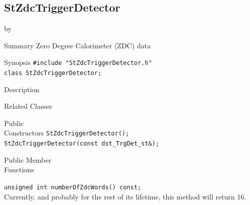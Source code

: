 \documentclass[twoside]{article}
\newcommand{\entrylabel}[1]{\mbox{\textbf{{#1}}}\hfil}%
\newenvironment{entry}
{\begin{list}{}%
    {\renewcommand{\makelabel}{\entrylabel}%
     \setlength{\labelwidth}{90pt}%
     \setlength{\leftmargin}{\labelwidth}
     \advance\leftmargin by \labelsep%
      }%
    }%
  {\end{list}}
\newcommand{\Entrylabel}[1]%
{\raisebox{0pt}[1ex][0pt]{\makebox[\labelwidth][l]%
    {\parbox[t]{\labelwidth}{\hspace{0pt}\textbf{{#1}}}}}}
\newenvironment{Entry}%
{\renewcommand{\entrylabel}{\Entrylabel}\begin{entry}}%
  {\end{entry}}
\begin{document}
\subsection{StZdcTriggerDetector}
\label{sec:StZdcTriggerDetector}
\begin{Entry}
\item[Summary] Zero Degree Calorimeter (ZDC) data
\item[Synopsis]
    \verb+#include "StZdcTriggerDetector.h"+\\
    \verb+class StZdcTriggerDetector;+\\
\item[Description]
\item[Related Classes]
    
\item[Public\\ Constructors]
    \verb+StZdcTriggerDetector();+\\
    \verb+StZdcTriggerDetector(const dst_TrgDet_st&);+\\
\item[Public Member\\ Functions]

    \verb+unsigned int numberOfZdcWords() const;+\\
    Currently, and probably for the rest of its lifetime, this method
    will return 16.
    

\end{Entry}
\end{document}

